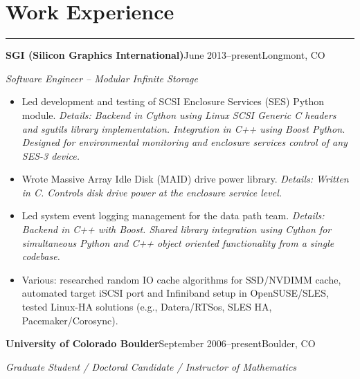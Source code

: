 \documentclass[letterpaper,10pt]{article}
\newcommand{\mblue}{\color{darkblue}}
\begin{document}
\section*{\mblue Work Experience}

\vspace{-2.15pc}
{\hfill\mblue\rule{5.245in}{0.02cm}}

\vspace{1pc}
\textbf{SGI (Silicon Graphics International)}\quad June 2013--present\hfill Longmont, CO

\bigbreak
\textit{Software Engineer -- Modular Infinite Storage}

\begin{itemize}
\item Led development and testing of SCSI Enclosure Services (SES) Python module. \textit{Details:
Backend in Cython using Linux SCSI Generic C headers and sgutils library implementation. Integration
in C++ using Boost Python. Designed for environmental monitoring and enclosure services control of
any SES-3 device.}

\item Wrote Massive Array Idle Disk (MAID) drive power library. \textit{Details: Written in C. Controls
disk drive power at the enclosure service level.}

\item Led system event logging management for the data path team. \textit{Details: Backend in C++
with Boost. Shared library integration using Cython for simultaneous Python and C++ object oriented
functionality from a single codebase.}

\item Various: researched random IO cache algorithms for SSD/NVDIMM cache, automated target iSCSI
port and Infiniband setup in OpenSUSE/SLES, tested Linux-HA solutions (e.g., Datera/RTSos, SLES HA,
Pacemaker/Corosync).
\end{itemize}

\vspace{1pc}
\textbf{University of Colorado Boulder}\quad September 2006--present\hfill Boulder, CO

\bigbreak
\textit{Graduate Student / Doctoral Candidate / Instructor of Mathematics}
\end{document}
